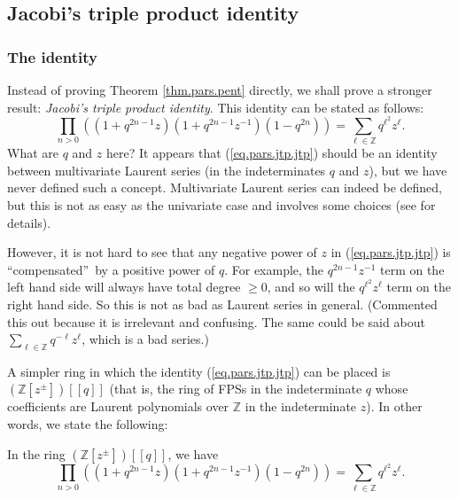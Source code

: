 \subsection{Jacobi's triple product identity}

\subsubsection{The identity}

Instead of proving Theorem \ref{thm.pars.pent} directly, we shall prove a
stronger result: \emph{Jacobi's triple product identity}. This identity can be
stated as follows:%
\begin{equation}
\prod_{n>0}\left(  \left(  1+q^{2n-1}z\right)  \left(  1+q^{2n-1}%
z^{-1}\right)  \left(  1-q^{2n}\right)  \right)  =\sum_{\ell\in\mathbb{Z}%
}q^{\ell^{2}}z^{\ell}. \label{eq.pars.jtp.jtp}%
\end{equation}
What are $q$ and $z$ here? It appears that (\ref{eq.pars.jtp.jtp}) should be
an identity between multivariate Laurent series (in the indeterminates $q$ and
$z$), but we have never defined such a concept. Multivariate Laurent series
can indeed be defined, but this is not as easy as the univariate case and
involves some choices (see \cite{ApaKau13} for details).

\begin{noncompile}
However, it is not hard to see that any negative power of $z$ in
(\ref{eq.pars.jtp.jtp}) is \textquotedblleft compensated\textquotedblright\ by
a positive power of $q$. For example, the $q^{2n-1}z^{-1}$ term on the left
hand side will always have total degree $\geq0$, and so will the $q^{\ell^{2}%
}z^{\ell}$ term on the right hand side. So this is not as bad as Laurent
series in general. (Commented this out because it is irrelevant and confusing.
The same could be said about $\sum_{\ell\in\mathbb{Z}}q^{-\ell}z^{\ell}$,
which is a bad series.)
\end{noncompile}

A simpler ring in which the identity (\ref{eq.pars.jtp.jtp}) can be placed is
$\left(  \mathbb{Z}\left[  z^{\pm}\right]  \right)  \left[  \left[  q\right]
\right]  $ (that is, the ring of FPSs in the indeterminate $q$ whose
coefficients are Laurent polynomials over $\mathbb{Z}$ in the indeterminate
$z$). In other words, we state the following:

\begin{theorem}
\label{thm.pars.jtp1}In the ring
$\left(  \mathbb{Z}\left[  z^{\pm}\right]  \right)  \left[  \left[  q\right]
\right]  $, we have%
\[
\prod_{n>0}\left(  \left(  1+q^{2n-1}z\right)  \left(  1+q^{2n-1}%
z^{-1}\right)  \left(  1-q^{2n}\right)  \right)  =\sum_{\ell\in\mathbb{Z}%
}q^{\ell^{2}}z^{\ell}.
\]

\end{theorem}

